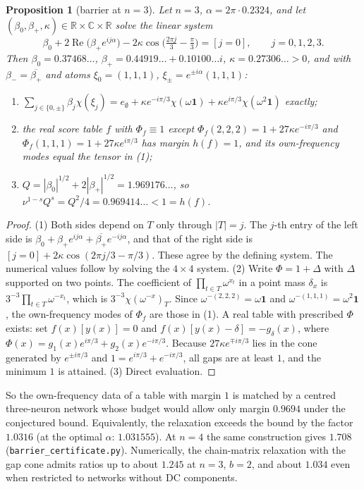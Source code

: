 \documentclass[11pt]{article}
\newtheorem{proposition}[theorem]{Proposition}
\theoremstyle{definition}
\newcommand{\R}{\mathbb{R}}
\newcommand{\C}{\mathbb{C}}
\begin{document}
\begin{proposition}[barrier at $n=3$]\label{prop:barrier}
Let $n=3$, $\alpha=2\pi\cdot0.2324$, and let $(\beta_0,\beta_+,\kappa)\in\R\times\C\times\R$ solve the linear system
\[
\beta_0+2\operatorname{Re}\!\big(\beta_+e^{ij\alpha}\big)-2\kappa\cos\!\big(\tfrac{2\pi j}{3}-\tfrac{\pi}{3}\big)=[j=0],\qquad j=0,1,2,3 .
\]
Then $\beta_0=0.37468\ldots$, $\beta_+=0.44919\ldots+0.10100\ldots i$, $\kappa=0.27306\ldots>0$, and with
$\beta_-=\overline{\beta_+}$ and atoms $\xi_0=(1,1,1)$, $\xi_\pm=e^{\pm i\alpha}(1,1,1)$:
\begin{enumerate}
\item $\sum_{j\in\{0,\pm\}}\beta_j\chi(\xi_j)=e_\emptyset+\kappa e^{-i\pi/3}\chi(\omega\mathbf 1)+\kappa e^{i\pi/3}\chi(\omega^2\mathbf 1)$ exactly;
\item the real score table $f$ with $\Phi_f\equiv1$ except $\Phi_f(2,2,2)=1+27\kappa e^{-i\pi/3}$ and $\Phi_f(1,1,1)=1+27\kappa e^{i\pi/3}$ has margin $h(f)=1$, and its own-frequency modes equal the tensor in (1);
\item $Q=|\beta_0|^{1/2}+2|\beta_+|^{1/2}=1.969176\ldots$, so $\nu^{1-s}Q^s=Q^2/4=0.969414\ldots<1=h(f)$.
\end{enumerate}
\end{proposition}
\begin{proof}
(1) Both sides depend on $T$ only through $|T|=j$. The $j$-th entry of the left side is
$\beta_0+\beta_+e^{ij\alpha}+\overline{\beta_+}e^{-ij\alpha}$, and that of the right side is
$[j=0]+2\kappa\cos(2\pi j/3-\pi/3)$. These agree by the defining system. The numerical values follow by solving
the $4\times4$ system.
(2) Write $\Phi=1+\Delta$ with $\Delta$ supported on two points. The coefficient of
$\prod_{t\in T}\omega^{x_t}$ in a point mass $\delta_{x}$ is $3^{-3}\prod_{t\in T}\omega^{-x_t}$, which is
$3^{-3}\chi(\omega^{-x})_T$. Since $\omega^{-(2,2,2)}=\omega\mathbf1$ and $\omega^{-(1,1,1)}=\omega^2\mathbf1$, the
own-frequency modes of $\Phi_f$ are those in (1). A real table with prescribed $\Phi$ exists: set $f(x)[y(x)]=0$
and $f(x)[y(x)-\delta]=-g_\delta(x)$, where $\Phi(x)=g_1(x)e^{i\pi/3}+g_2(x)e^{-i\pi/3}$. Because
$27\kappa e^{\mp i\pi/3}$ lies in the cone generated by $e^{\pm i\pi/3}$ and $1=e^{i\pi/3}+e^{-i\pi/3}$, all gaps are
at least $1$, and the minimum $1$ is attained.
(3) Direct evaluation.
\end{proof}

So the own-frequency data of a table with margin $1$ is matched by a centred three-neuron network whose budget
would allow only margin $0.9694$ under the conjectured bound. Equivalently, the relaxation exceeds the bound by
the factor $1.0316$ (at the optimal $\alpha$: $1.031555$). At $n=4$ the same construction gives $1.708$
(\texttt{barrier\_certificate.py}). Numerically, the chain-matrix relaxation with the gap cone admits ratios up to
about $1.245$ at $n=3$, $b=2$, and about $1.034$ even when restricted to networks without DC components.
\end{document}
